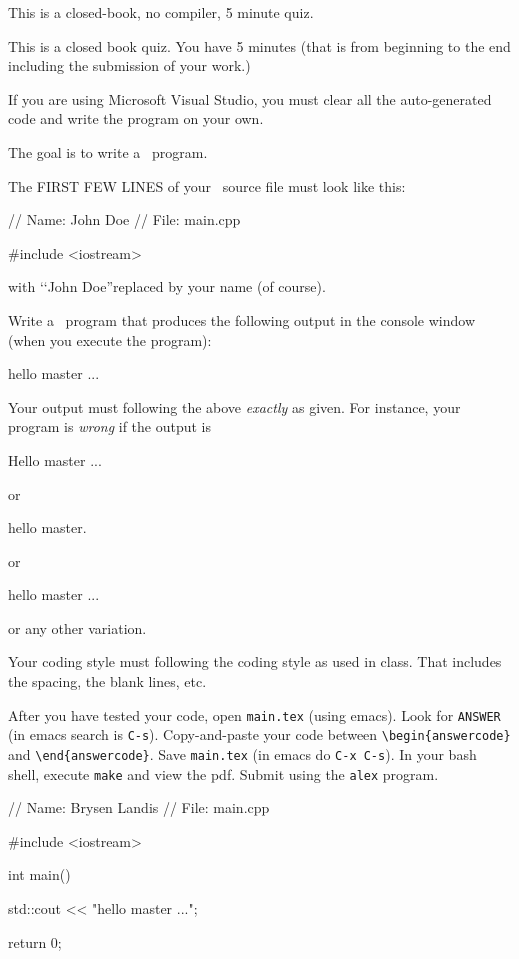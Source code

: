 

This is a closed-book, no compiler, 5 minute quiz.

This is a closed book quiz.
You have 5 minutes (that is from beginning to the end including
the submission of your work.)

If you are using Microsoft Visual Studio, you must clear all the
auto-generated code and write the program on your own.

\nextq
The goal is to write a \cpp\ program.

The FIRST FEW LINES of your \cpp\ source file must look like this:
\begin{console}
// Name: John Doe
// File: main.cpp

#include <iostream>
\end{console}
with \lq\lq John Doe''replaced by your name (of course).

Write a \cpp\ program that produces the following output in the console
window (when you execute the program):
\begin{console}
hello master ...
\end{console}
Your output must following the above \textit{exactly} as given.
For instance,
your program is \textit{wrong} if the output is
\begin{console}
Hello master ...
\end{console}
or
\begin{console}
hello master.
\end{console}
or
\begin{console}
hello    master ...
\end{console}
or any other variation.

Your coding style must following the coding style as used in class.
That includes the spacing, the blank lines, etc.

After you have tested your code, open \verb!main.tex! (using emacs).
Look for \verb!ANSWER! (in emacs search is \verb!C-s!).
Copy-and-paste your code between \verb!\begin{answercode}! and
\verb!\end{answercode}!.
Save \verb!main.tex! (in emacs do \verb!C-x C-s!).
In your bash shell, execute \verb!make! and view the pdf.
Submit using the \verb!alex! program.

\ANSWER
\begin{answercode}
// Name: Brysen Landis
// File: main.cpp

#include <iostream>

int main()
{
  std::cout << "hello master ...\n";
  
  return 0;
}
\end{answercode}

